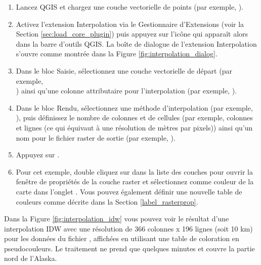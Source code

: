 \begin{enumerate}
  \item Lancez QGIS et chargez une couche vectorielle de points (par 
  exemple, ). 
  \item Activez l'extension Interpolation via le Gestionnaire d'Extensions 
  (voir la Section \ref{sec:load_core_plugin}) puis appuyez sur l'ic\^one
   qui appara\^it alors dans la barre 
  d'outils QGIS. La bo\^ite de dialogue de l'extension Interpolation s'ouvre 
  comme montr\'ee dans la Figure \ref{fig:interpolation_dialog}.
  \item Dans le bloc Saisie, s\'electionnez une couche vectorielle de d\'epart 
  (par exemple,\\ ) ainsi qu'une colonne 
  attributaire pour l'interpolation (par exemple, ).
  \item Dans le bloc Rendu, s\'electionnez une m\'ethode d'interpolation 
  (par exemple,\\ ), puis 
  d\'efinissez le nombre de colonnes et de cellules (par exemple,  colonnes 
  et  lignes (ce qui \'equivaut \`a une r\'esolution de  m\`etres par 
  pixels)) ainsi qu'un nom pour le fichier raster de sortie
  (par exemple, ).
  \item Appuyez sur .
  \item Pour cet exemple, double cliquez sur  dans la
  liste des couches pour ouvrir la fen\^etre de propri\'et\'es de la couche raster 
  et s\'electionnez  comme couleur de la 
  carte dans l'onglet . Vous pouvez \'egalement d\'efinir une 
  nouvelle table de couleurs comme d\'ecrite dans la Section \ref{label_rasterprop}.
\end{enumerate}

Dans la Figure \ref{fig:interpolation_idw} vous pouvez voir le r\'esultat d'une
interpolation IDW avec une r\'esolution de 366 colonnes x 196 lignes (soit 
10 km) pour les donn\'ees du fichier , affich\'ees en utilisant 
une table de coloration en pseudocouleurs. Le traitement ne prend que quelques 
minutes et couvre la partie nord de l'Alaska.

